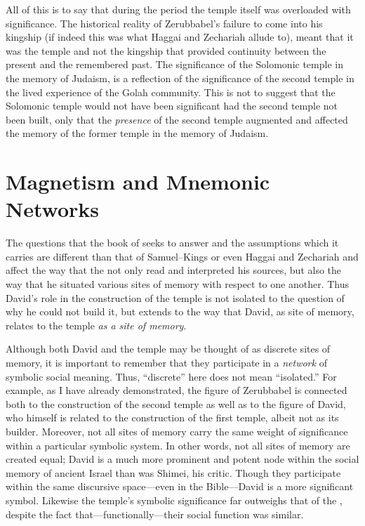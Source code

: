 All of this is to say that during the \secondtemple period the temple itself was overloaded with significance. The historical reality of Zerubbabel's failure to come into his kingship (if  indeed this was what Haggai and Zechariah allude to), meant that it was the temple and not the kingship that provided continuity between the present and the remembered past. The significance of the Solomonic temple in the memory of \secondtemple Judaism, is a reflection of the significance of the second temple in the lived experience of the Golah community. This is not to suggest that the Solomonic temple would not have been significant had the second temple not been built, only that the \emph{presence} of the second temple augmented and affected the memory of the former temple in the memory of \secondtemple Judaism.


\section{Magnetism and Mnemonic Networks}

The questions that the book of \chronicles seeks to answer and the assumptions which it carries are different than that of Samuel--Kings or even Haggai and Zechariah and affect the way that the \chronicler not only read and interpreted his sources, but also the way that he situated various sites of memory with respect to one another. Thus David's role in the construction of the temple is not isolated to the question of why he could not build it, but extends to the way that David, as site of memory, relates to the temple \emph{as a site of memory}.

Although both David and the temple may be thought of as discrete sites of memory, it is important to remember that they participate in a \emph{network} of symbolic social meaning. Thus, ``discrete'' here does not mean ``isolated.'' For example, as I have already demonstrated, the figure of Zerubbabel is connected both to the construction of the second temple as well as to the figure of David, who himself is related to the construction of the first temple, albeit not as its builder. Moreover, not all sites of memory carry the same weight of significance within a particular symbolic system. In other words, not all sites of memory are created equal; David is a much more prominent and potent node within the social memory of ancient Israel than was Shimei, his critic. Though they participate within the same discursive space---even in the Bible---David is a more significant symbol. Likewise the temple's symbolic significance far outweighs that of the , despite the fact that---functionally---their social function was similar.

